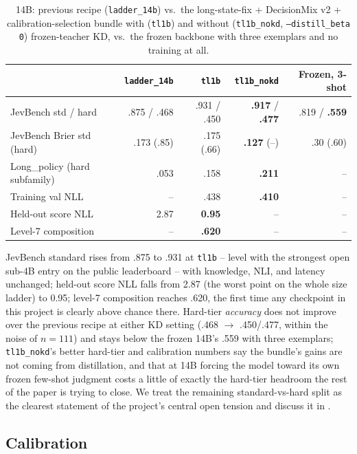 \begin{table}[t]
  \centering
  \caption{14B: previous recipe (\texttt{ladder\_14b}) vs.\ the long-state-fix + DecisionMix v2 +
  calibration-selection bundle with (\texttt{tl1b}) and without (\texttt{tl1b\_nokd},
  \texttt{--distill\_beta 0}) frozen-teacher KD, vs.\ the frozen backbone with three exemplars and no
  training at all.}
  \label{tab:tl1b}
  \small
  \begin{tabular}{lrrrr}
    \toprule
    & \texttt{ladder\_14b} & \texttt{tl1b} & \texttt{tl1b\_nokd} & Frozen, 3-shot \\
    \midrule
    JevBench std / hard & .875 / .468 & .931 / .450 & \textbf{.917} / \textbf{.477} & .819 / \textbf{.559} \\
    JevBench Brier std (hard) & .173 (.85) & .175 (.66) & \textbf{.127} (--) & .30 (.60) \\
    Long\_policy (hard subfamily) & .053 & .158 & \textbf{.211} & -- \\
    Training val NLL & -- & .438 & \textbf{.410} & -- \\
    Held-out score NLL & 2.87 & \textbf{0.95} & -- & -- \\
    Level-7 composition & -- & \textbf{.620} & -- & -- \\
    \bottomrule
  \end{tabular}
\end{table}

JevBench standard rises from .875 to .931 at \texttt{tl1b} -- level with the strongest open sub-4B entry
on the public leaderboard -- with knowledge, NLI, and latency unchanged; held-out score NLL falls from
2.87 (the worst point on the whole size ladder) to 0.95; level-7 composition reaches .620, the first time
any checkpoint in this project is clearly above chance there. Hard-tier \emph{accuracy} does not improve
over the previous recipe at either KD setting (.468 $\to$ .450/.477, within the noise of $n{=}111$) and
stays below the frozen 14B's .559 with three exemplars; \texttt{tl1b\_nokd}'s better hard-tier and
calibration numbers say the bundle's gains are not coming from distillation, and that at 14B forcing the
model toward its own frozen few-shot judgment costs a little of exactly the hard-tier headroom the rest of
the paper is trying to close. We treat the remaining standard-vs-hard split as the clearest statement of
the project's central open tension and discuss it in .

\subsection{Calibration}
\label{sec:results:calibration}

